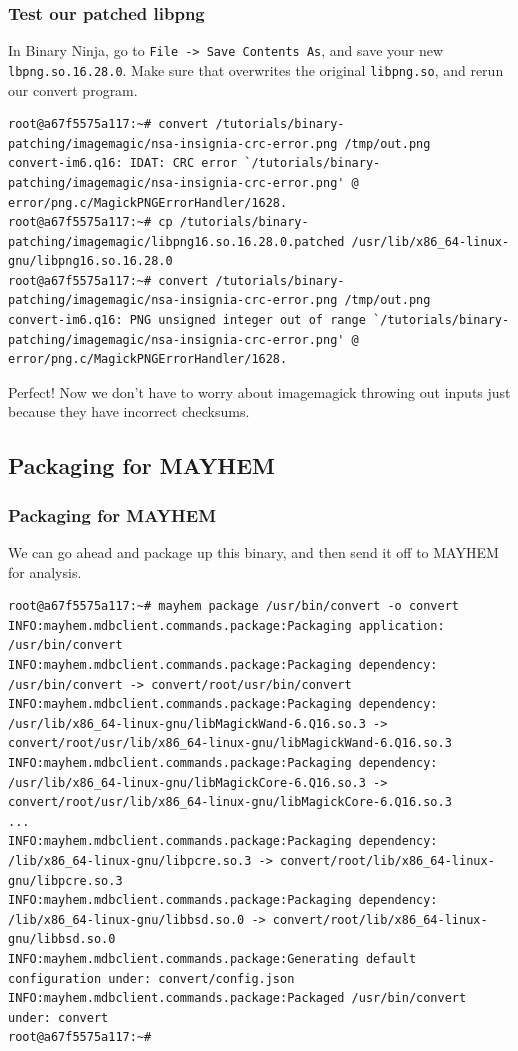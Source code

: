 \documentclass{beamer}
\begin{document}
\begin{frame}[fragile]
\frametitle{Test our patched libpng}
In Binary Ninja, go to \texttt{File -> Save Contents As}, and save your new
\texttt{lbpng.so.16.28.0}. Make sure that overwrites the original
\texttt{libpng.so}, and rerun our convert program.

\begin{lstlisting}
root@a67f5575a117:~# convert /tutorials/binary-patching/imagemagic/nsa-insignia-crc-error.png /tmp/out.png
convert-im6.q16: IDAT: CRC error `/tutorials/binary-patching/imagemagic/nsa-insignia-crc-error.png' @ error/png.c/MagickPNGErrorHandler/1628.
root@a67f5575a117:~# cp /tutorials/binary-patching/imagemagic/libpng16.so.16.28.0.patched /usr/lib/x86_64-linux-gnu/libpng16.so.16.28.0 
root@a67f5575a117:~# convert /tutorials/binary-patching/imagemagic/nsa-insignia-crc-error.png /tmp/out.png
convert-im6.q16: PNG unsigned integer out of range `/tutorials/binary-patching/imagemagic/nsa-insignia-crc-error.png' @ error/png.c/MagickPNGErrorHandler/1628.
\end{lstlisting}

Perfect! Now we don’t have to worry about imagemagick throwing out inputs just
because they have incorrect checksums.
\end{frame}


\subsection{Packaging for MAYHEM}

\begin{frame}[fragile]
\frametitle{Packaging for MAYHEM}
We can go ahead and package up this binary, and then send it off to MAYHEM for
analysis.

\begin{lstlisting}[breaklines=false]
root@a67f5575a117:~# mayhem package /usr/bin/convert -o convert
INFO:mayhem.mdbclient.commands.package:Packaging application: /usr/bin/convert
INFO:mayhem.mdbclient.commands.package:Packaging dependency: /usr/bin/convert -> convert/root/usr/bin/convert
INFO:mayhem.mdbclient.commands.package:Packaging dependency: /usr/lib/x86_64-linux-gnu/libMagickWand-6.Q16.so.3 -> convert/root/usr/lib/x86_64-linux-gnu/libMagickWand-6.Q16.so.3
INFO:mayhem.mdbclient.commands.package:Packaging dependency: /usr/lib/x86_64-linux-gnu/libMagickCore-6.Q16.so.3 -> convert/root/usr/lib/x86_64-linux-gnu/libMagickCore-6.Q16.so.3
...
INFO:mayhem.mdbclient.commands.package:Packaging dependency: /lib/x86_64-linux-gnu/libpcre.so.3 -> convert/root/lib/x86_64-linux-gnu/libpcre.so.3
INFO:mayhem.mdbclient.commands.package:Packaging dependency: /lib/x86_64-linux-gnu/libbsd.so.0 -> convert/root/lib/x86_64-linux-gnu/libbsd.so.0
INFO:mayhem.mdbclient.commands.package:Generating default configuration under: convert/config.json
INFO:mayhem.mdbclient.commands.package:Packaged /usr/bin/convert under: convert
root@a67f5575a117:~#
\end{lstlisting}
\end{frame}
\end{document}
